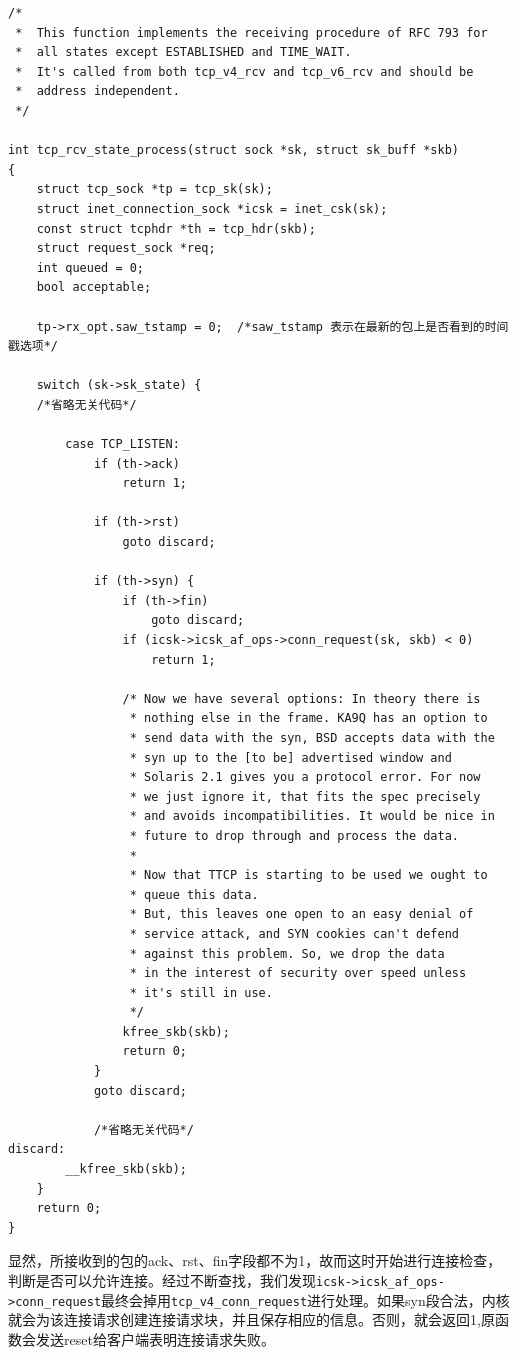 \begin{verbatim}
/*
 *  This function implements the receiving procedure of RFC 793 for
 *  all states except ESTABLISHED and TIME_WAIT.
 *  It's called from both tcp_v4_rcv and tcp_v6_rcv and should be
 *  address independent.
 */

int tcp_rcv_state_process(struct sock *sk, struct sk_buff *skb)
{
    struct tcp_sock *tp = tcp_sk(sk);
    struct inet_connection_sock *icsk = inet_csk(sk);
    const struct tcphdr *th = tcp_hdr(skb);
    struct request_sock *req;
    int queued = 0;
    bool acceptable;

    tp->rx_opt.saw_tstamp = 0;  /*saw_tstamp 表示在最新的包上是否看到的时间戳选项*/

    switch (sk->sk_state) {
    /*省略无关代码*/

		case TCP_LISTEN:
		    if (th->ack)
		        return 1;

		    if (th->rst)
		        goto discard;

		    if (th->syn) {
		        if (th->fin)
		            goto discard;
		        if (icsk->icsk_af_ops->conn_request(sk, skb) < 0)
		            return 1;

		        /* Now we have several options: In theory there is
		         * nothing else in the frame. KA9Q has an option to
		         * send data with the syn, BSD accepts data with the
		         * syn up to the [to be] advertised window and
		         * Solaris 2.1 gives you a protocol error. For now
		         * we just ignore it, that fits the spec precisely
		         * and avoids incompatibilities. It would be nice in
		         * future to drop through and process the data.
		         *
		         * Now that TTCP is starting to be used we ought to
		         * queue this data.
		         * But, this leaves one open to an easy denial of
		         * service attack, and SYN cookies can't defend
		         * against this problem. So, we drop the data
		         * in the interest of security over speed unless
		         * it's still in use.
		         */
		        kfree_skb(skb);
		        return 0;
		    }
		    goto discard;

		    /*省略无关代码*/
discard:
        __kfree_skb(skb);
    }
    return 0;
}
\end{verbatim}

                显然，所接收到的包的ack、rst、fin字段都不为1，故而这时开始进行连接检查，判断是否可以允许连接。经过不断查找，我们发现\texttt{icsk->icsk_af_ops->conn_request}最终会掉用\texttt{tcp_v4_conn_request}进行处理。如果syn段合法，内核就会为该连接请求创建连接请求块，并且保存相应的信息。否则，就会返回1,原函数会发送reset给客户端表明连接请求失败。

